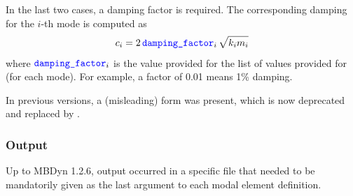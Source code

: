 In the last two cases, a damping factor is required.
The corresponding damping for the $i$-th mode is computed as
\begin{displaymath}
	c_i = 2 \, \textcolor{blue}{\texttt{damping\_factor}}_i \, \sqrt{k_i m_i}
\end{displaymath}
where $\textcolor{blue}{\texttt{damping\_factor}}_i$ is the value provided for the list 
of values provided for  (for each mode).
For example, a factor of 0.01 means 1\% damping.

In previous versions, a (misleading)  form
was present, which is now deprecated and replaced by .



\subsubsection{Output}
Up to MBDyn 1.2.6, output occurred in a specific file that needed
to be mandatorily given as the last argument to each modal element
definition.


